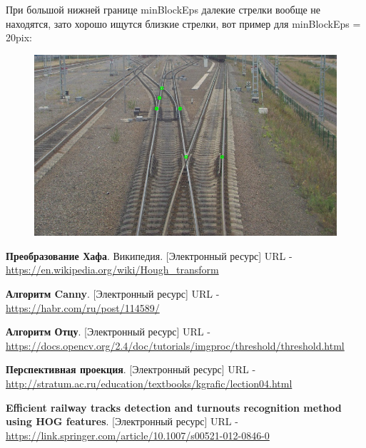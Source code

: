 При большой нижней границе minBlockEps далекие стрелки вообще не находятся, зато хорошо ищутся близкие стрелки, вот пример для minBlockEps = 20pix:
\begin{figure}[!h]
	\centering
	\includegraphics[width=0.7\linewidth]{pictures/45_20.png}
	\caption[Y - обратное]{}
	\label{fig:45_20}
\end{figure}


\newpage
{}

\begin{thebibliography}{2}
	\textbf{Преобразование Хафа}. Википедия. [Электронный ресурс] URL - 
	\href{https://en.wikipedia.org/wiki/Hough\_transform}{https://en.wikipedia.org/wiki/Hough\_transform}
	
	\textbf{Алгоритм Canny}. [Электронный ресурс] URL - 
	\href{https://habr.com/ru/post/114589/}{https://habr.com/ru/post/114589/}
	
	\textbf{Алгоритм Отцу}. [Электронный ресурс] URL - 
	\href{https://docs.opencv.org/2.4/doc/tutorials/imgproc/threshold/threshold.html}{https://docs.opencv.org/2.4/doc/tutorials/imgproc/threshold/threshold.html}
	
	\textbf{Перспективная проекция}. [Электронный ресурс] URL - 
	\href{http://stratum.ac.ru/education/textbooks/kgrafic/lection04.html}{http://stratum.ac.ru/education/textbooks/kgrafic/lection04.html}
	
	\textbf{Efficient railway tracks detection and turnouts recognition method using HOG features}. [Электронный ресурс] URL - 
	\href{https://link.springer.com/article/10.1007/s00521-012-0846-0}{https://link.springer.com/article/10.1007/s00521-012-0846-0}
	
\end{thebibliography}		  		 		